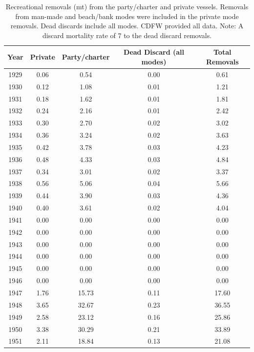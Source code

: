 \documentclass[12pt,]{article}
\begin{document}
\FloatBarrier
\newpage

\begin{longtable}{ccccc}
\caption{Recreational removals (mt) from the party/charter 
                                        and private vessels. Removals from man-made and 
                                        beach/bank modes were included in the private mode
                                        removals. Dead discards include all modes. CDFW provided 
                                        all data. Note: A discard mortality rate of 7%
                                        to the dead discard removals.} \\ 
  \hline
Year & Private & Party/charter & Dead Discard (all modes) & Total Removals \\ 
  \hline \endhead  \hline
1929 & 0.06 & 0.54 & 0.00 & 0.61 \\ 
  1930 & 0.12 & 1.08 & 0.01 & 1.21 \\ 
  1931 & 0.18 & 1.62 & 0.01 & 1.81 \\ 
  1932 & 0.24 & 2.16 & 0.01 & 2.42 \\ 
  1933 & 0.30 & 2.70 & 0.02 & 3.02 \\ 
  1934 & 0.36 & 3.24 & 0.02 & 3.63 \\ 
  1935 & 0.42 & 3.78 & 0.03 & 4.23 \\ 
  1936 & 0.48 & 4.33 & 0.03 & 4.84 \\ 
  1937 & 0.34 & 3.01 & 0.02 & 3.37 \\ 
  1938 & 0.56 & 5.06 & 0.04 & 5.66 \\ 
  1939 & 0.44 & 3.90 & 0.03 & 4.36 \\ 
  1940 & 0.40 & 3.61 & 0.02 & 4.04 \\ 
  1941 & 0.00 & 0.00 & 0.00 & 0.00 \\ 
  1942 & 0.00 & 0.00 & 0.00 & 0.00 \\ 
  1943 & 0.00 & 0.00 & 0.00 & 0.00 \\ 
  1944 & 0.00 & 0.00 & 0.00 & 0.00 \\ 
  1945 & 0.00 & 0.00 & 0.00 & 0.00 \\ 
  1946 & 0.00 & 0.00 & 0.00 & 0.00 \\ 
  1947 & 1.76 & 15.73 & 0.11 & 17.60 \\ 
  1948 & 3.65 & 32.67 & 0.23 & 36.55 \\ 
  1949 & 2.58 & 23.12 & 0.16 & 25.86 \\ 
  1950 & 3.38 & 30.29 & 0.21 & 33.89 \\ 
  1951 & 2.11 & 18.84 & 0.13 & 21.08 \\ 

\end{longtable}
\end{document}
